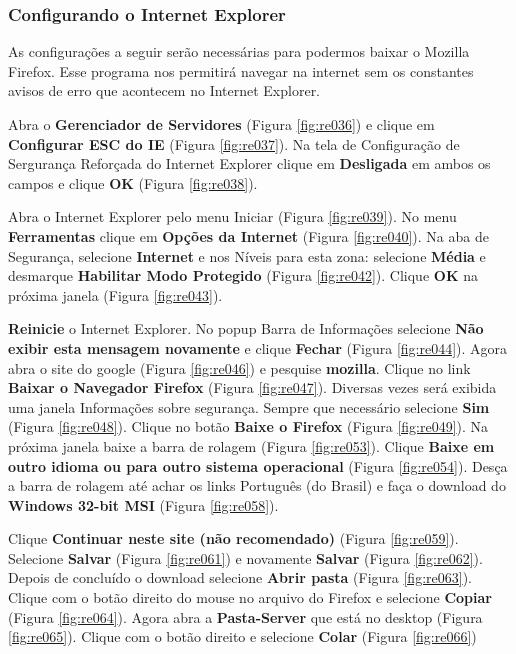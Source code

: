 \documentclass[10pt]{article}
\begin{document}
\subsubsection{Configurando o Internet Explorer}
As configurações a seguir serão necessárias para podermos baixar o Mozilla Firefox. Esse programa nos permitirá navegar na internet sem os constantes avisos de erro que acontecem no Internet Explorer.

\par Abra o \textbf{Gerenciador de Servidores} (Figura \ref{fig:re036}) e clique em \textbf{Configurar ESC do IE} (Figura \ref{fig:re037}). Na tela de Configuração de Sergurança Reforçada do Internet Explorer clique em \textbf{Desligada} em ambos os campos e clique \textbf{OK} (Figura \ref{fig:re038}).

\par Abra o Internet Explorer pelo menu Iniciar (Figura \ref{fig:re039}). No menu \textbf{Ferramentas} clique em \textbf{Opções da Internet} (Figura \ref{fig:re040}). Na aba de Segurança, selecione \textbf{Internet} e nos Níveis para esta zona: selecione \textbf{Média} e desmarque \textbf{Habilitar Modo Protegido} (Figura \ref{fig:re042}).  Clique \textbf{OK} na próxima janela (Figura \ref{fig:re043}).

\par \textbf{Reinicie} o Internet Explorer. No popup Barra de Informações selecione \textbf{Não exibir esta mensagem novamente} e clique \textbf{Fechar} (Figura \ref{fig:re044}). Agora abra o site do google (Figura \ref{fig:re046}) e pesquise \textbf{mozilla}. Clique no link \textbf{Baixar o Navegador Firefox} (Figura \ref{fig:re047}). Diversas vezes será exibida uma janela Informações sobre segurança. Sempre que necessário selecione \textbf{Sim} (Figura \ref{fig:re048}). Clique no botão \textbf{Baixe o Firefox} (Figura \ref{fig:re049}). Na próxima janela baixe a barra de rolagem (Figura \ref{fig:re053}). Clique \textbf{Baixe em outro idioma ou para outro sistema operacional} (Figura \ref{fig:re054}). Desça a barra de rolagem até achar os links Português (do Brasil) e faça o download do \textbf{Windows 32-bit MSI} (Figura \ref{fig:re058}). 

\par Clique \textbf{Continuar neste site (não recomendado)} (Figura \ref{fig:re059}). Selecione \textbf{Salvar} (Figura \ref{fig:re061}) e novamente \textbf{Salvar} (Figura \ref{fig:re062}). Depois de concluído o download selecione \textbf{Abrir pasta} (Figura \ref{fig:re063}). Clique com o botão direito do mouse no arquivo do Firefox e selecione \textbf{Copiar} (Figura \ref{fig:re064}). Agora abra a \textbf{Pasta-Server} que está no desktop (Figura \ref{fig:re065}). Clique com o botão direito e selecione \textbf{Colar} (Figura \ref{fig:re066})
\end{document}
